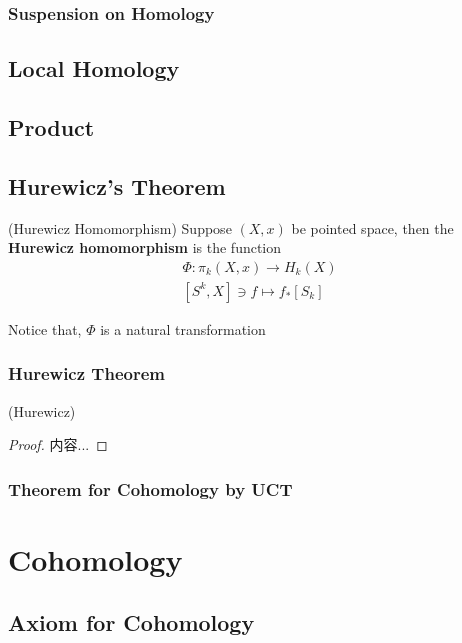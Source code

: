 \documentclass[Total.tex]{subfiles}
\begin{document}
		\subsection{Suspension on Homology}
		\section{Local Homology}
		\section{Product}
		\section{Hurewicz's Theorem}
			\begin{Def}
				(Hurewicz Homomorphism) Suppose $(X,x)$ be pointed space, then the \textbf{Hurewicz homomorphism} is the function
				\begin{gather*}
					\Phi:\pi_k(X,x)\rightarrow H_k(X)\\
					[S^k,X]\ni f\mapsto f_*[S_k]
				\end{gather*}
				
				Notice that, $\Phi$ is a natural transformation
				\begin{center}
				\end{center}
			\end{Def}
			
			\subsection{Hurewicz Theorem}
				\begin{theorem}
					(Hurewicz) 
				\end{theorem}
				\begin{proof}
					内容...
				\end{proof}
			\subsection{Theorem for Cohomology by UCT}
	\chapter{Cohomology}
		\section{Axiom for Cohomology}
\end{document}
